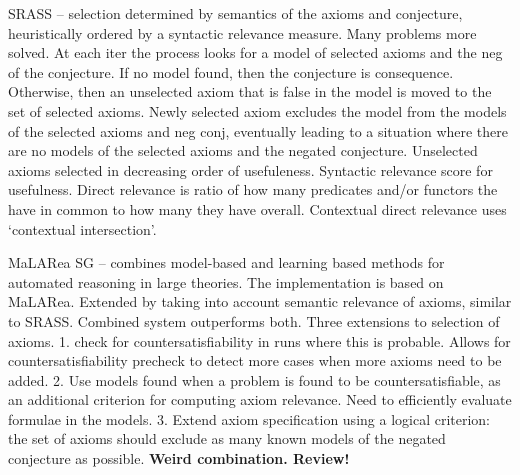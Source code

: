 \documentclass{article}
\begin{document}
SRASS \cite{SRASS} -- selection determined by semantics of the axioms and
conjecture, heuristically ordered by a syntactic relevance measure. Many
problems more solved. At each iter the process looks for a model of selected
axioms and the neg of the conjecture. If no model found, then the conjecture is
consequence. Otherwise, then an unselected axiom that is false in the model is
moved to the set of selected axioms. Newly selected axiom excludes the model
from the models of the selected axioms and neg conj, eventually leading to
a situation where there are no models of the selected axioms and the negated
conjecture. Unselected axioms selected in decreasing order of usefuleness.
Syntactic relevance score for usefulness. Direct relevance is ratio of how many
predicates and/or functors the have in common to how many they have overall.
Contextual direct relevance uses `contextual intersection'.

MaLARea SG \cite{MaLAReaSG} -- combines model-based and learning based methods
for automated reasoning in large theories. The implementation is based on
MaLARea. Extended by taking into account semantic relevance of axioms, similar
to SRASS. Combined system outperforms both. Three extensions to selection of
axioms. 1. check for countersatisfiability in runs where this is probable.
Allows for countersatisfiability precheck to detect more cases when more axioms
need to be added. 2. Use models found when a problem is found to be
countersatisfiable, as an additional criterion for computing axiom relevance.
Need to efficiently evaluate formulae in the models. 3. Extend axiom
specification using a logical criterion: the set of axioms should exclude as
many known models of the negated conjecture as possible. \textbf{Weird
combination. Review!}
\end{document}
